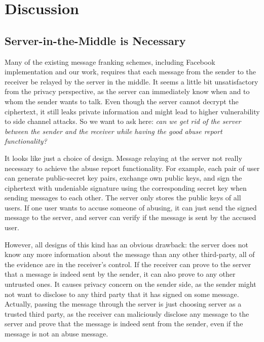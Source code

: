 
\section{Discussion}

\subsection{Server-in-the-Middle is Necessary}
Many of the existing message franking schemes,
including Facebook implementation and our work,
requires that each message from the sender to the receiver be relayed by the server in the middle.
It seems a little bit unsatisfactory from the privacy perspective,
as the server can immediately know when and to whom the sender wants to talk.
Even though the server cannot decrypt the ciphertext,
it still leaks private information and might lead to higher vulnerability to side channel attacks.
So we want to ask here: \emph{can we get rid of the server between the sender and the receiver while having the good abuse report functionality?}

It looks like just a choice of design.
Message relaying at the server not really necessary to achieve the abuse report functionality.
For example, each pair of user can generate public-secret key pairs, exchange own public keys,
and sign the ciphertext with undeniable signature using the corresponding secret key when sending messages to each other.
The server only stores the public keys of all users.
If one user wants to accuse someone of abusing, it can just send the signed message to the server,
and server can verify if the message is sent by the accused user.

However, all designs of this kind has an obvious drawback:
the server does not know any more information about the message than any other third-party,
all of the evidence are in the receiver's control. 
If the receiver can prove to the server that a message is indeed sent by the sender,
it can also prove to any other untrusted ones.
It causes privacy concern on the sender side, 
as the sender might not want to disclose to any third party that it has signed on some message.
Actually, passing the message through the server
is just choosing server as a trusted third party,
as the receiver can maliciously disclose any message to the server and prove that the message is indeed sent from the sender,
even if the message is not an abuse message.



